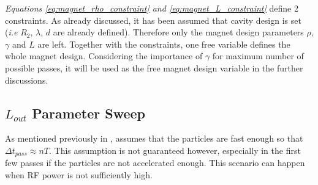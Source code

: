 \documentclass{article}
\begin{document}
\textit{Equations \ref{eq:magnet_rho_constraint} and \ref{eq:magnet_L_constraint}} define 2 constraints. As already discussed, it has been assumed that cavity design is set (\textit{i.e} $R_2$, $\lambda$, $d$ are already defined).
Therefore only the magnet design parameters $\rho$, $\gamma$ and $L$ are left. Together with the constraints, one free variable defines the whole magnet design. 
Considering the importance of $\gamma$ for maximum number of possible passes, it will be used as the free magnet design variable in the further discussions.


\subsection{$L_{out}$ Parameter Sweep} \label{sec:parameter_sweep}

As mentioned previously in ,  assumes that the particles are fast enough so that $\Delta t_{pass} \approx n T$. 
This assumption is not guaranteed however, especially in the first few passes if the particles are not accelerated enough. 
This scenario can happen when RF power is not sufficiently high. 
\end{document}
